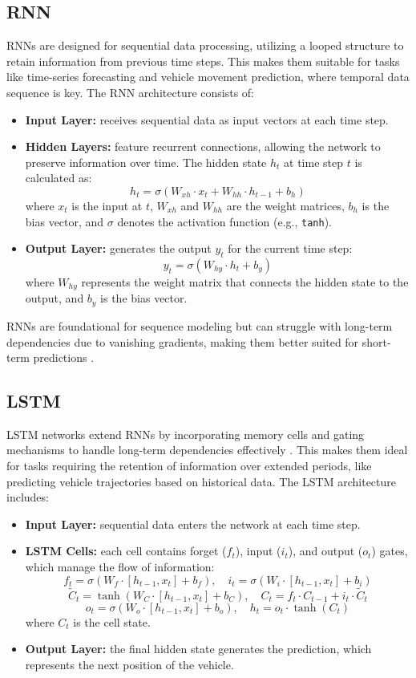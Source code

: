 \documentclass[conference]{IEEEtran}
\begin{document}
{\subsection{RNN}
RNNs are designed for sequential data processing, utilizing a looped structure to retain information from previous time steps. This makes them suitable for tasks like time-series forecasting and vehicle movement prediction, where temporal data sequence is key. The RNN architecture consists of:
\begin{itemize}
    \item \textbf{Input Layer:} receives sequential data as input vectors at each time step.
    \item \textbf{Hidden Layers:} feature recurrent connections, allowing the network to preserve information over time. The hidden state \( h_t \) at time step \( t \) is calculated as:
    \[
    h_t = \sigma(W_{xh} \cdot x_t + W_{hh} \cdot h_{t-1} + b_h)
    \]
    where \( x_t \) is the input at \( t \), \( W_{xh} \) and \( W_{hh} \) are the weight matrices, \( b_h \) is the bias vector, and \( \sigma \) denotes the activation function (e.g., \texttt{tanh}).
    \item \textbf{Output Layer:} generates the output \( y_t \) for the current time step:
    \[
    y_t = \sigma(W_{hy} \cdot h_t + b_y)
    \]
    where \( W_{hy} \) represents the weight matrix that connects the hidden state to the output, and \( b_y \) is the bias vector.
\end{itemize}

RNNs are foundational for sequence modeling but can struggle with long-term dependencies due to vanishing gradients, making them better suited for short-term predictions \cite{prep23ghojogh}.

\subsection{LSTM}
LSTM networks extend RNNs by incorporating memory cells and gating mechanisms to handle long-term dependencies effectively \cite{6795963}. This makes them ideal for tasks requiring the retention of information over extended periods, like predicting vehicle trajectories based on historical data. The LSTM architecture includes:
\begin{itemize}
    \item \textbf{Input Layer:} sequential data enters the network at each time step.
    \item \textbf{LSTM Cells:} each cell contains forget (\( f_t \)), input (\( i_t \)), and output  (\( o_t \)) gates, which manage the flow of information:
    \[
    f_t = \sigma(W_f \cdot [h_{t-1}, x_t] + b_f), \quad i_t = \sigma(W_i \cdot [h_{t-1}, x_t] + b_i)
    \]
    \[
    \tilde{C}_t = \tanh(W_C \cdot [h_{t-1}, x_t] + b_C), \quad C_t = f_t \cdot C_{t-1} + i_t \cdot \tilde{C}_t
    \]
    \[
    o_t = \sigma(W_o \cdot [h_{t-1}, x_t] + b_o), \quad h_t = o_t \cdot \tanh(C_t)
    \]
    where \( C_t \) is the cell state.
    \item \textbf{Output Layer:} the final hidden state generates the prediction, which represents the next position of the vehicle.    
\end{itemize}

}
\end{document}
